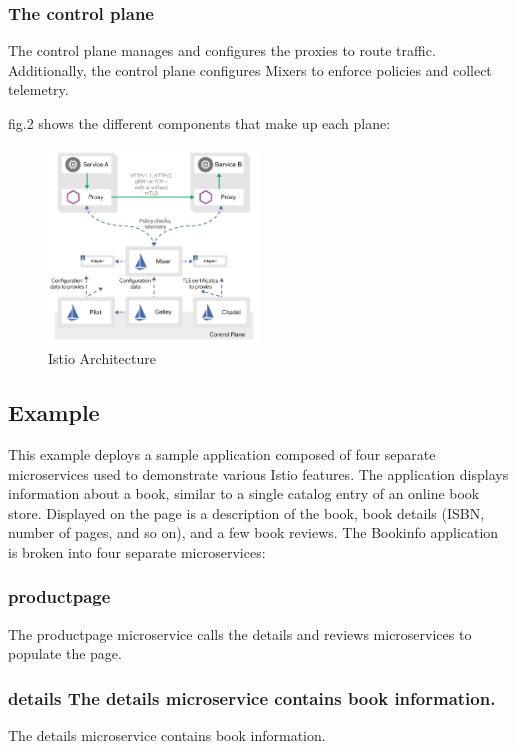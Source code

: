 \documentclass[conference]{IEEEtran}
\begin{document}
\subsubsection{The control plane}
The control plane manages and configures the proxies to route traffic. Additionally, the control plane configures Mixers to enforce policies and collect telemetry.\cite{Concepts}

fig.2 shows the different components that make up each plane:
\begin{figure}[htbp]
	\centering
	\includegraphics[width=0.5\textwidth]{figure/2.jpg}
	\caption{Istio Architecture\label{fig:2}}
\end{figure}

\subsection{Example}
This example deploys a sample application composed of four separate microservices used to demonstrate various Istio features. The application displays information about a book, similar to a single catalog entry of an online book store. Displayed on the page is a description of the book, book details (ISBN, number of pages, and so on), and a few book reviews.\cite{bookinfo}
The Bookinfo application is broken into four separate microservices:
\subsubsection{productpage}
The productpage microservice calls the details and reviews microservices to populate the page.

\subsubsection{details The details microservice contains book information.}
The details microservice contains book information.
\end{document}
